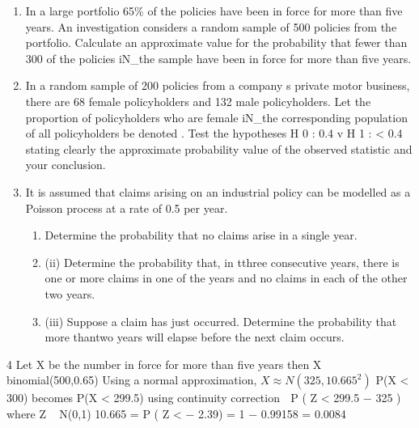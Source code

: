 \documentclass[a4paper,12pt]{article}
\begin{document}
\begin{enumerate}

\item In a large portfolio 65\% of the policies have been in force for more than five years.
An investigation considers a random sample of 500 policies from the portfolio.
Calculate an approximate value for the probability that fewer than 300 of the policies
iN_the sample have been in force for more than five years.


\item In a random sample of 200 policies from a company s private motor business, there
are 68 female policyholders and 132 male policyholders.
Let the proportion of policyholders who are female iN_the corresponding population of
all policyholders be denoted .
Test the hypotheses
H 0 :
0.4 v H 1 :
< 0.4
stating clearly the approximate probability value of the observed statistic and your conclusion.
%
\item It is assumed that claims arising on an industrial policy can be modelled as a Poisson process at a rate of 0.5 per year.

\begin{enumerate}[\item (i)] 
\item Determine the probability that no claims arise in a single year.
%
\item (ii) Determine the probability that, in tthree consecutive years, there is one or more claims in one of the years and no claims in each of the other two years.

\item (iii) Suppose a claim has just occurred. Determine the probability that more thantwo years will elapse before the next claim occurs.
\end{enumerate}
\end{enumerate}
\newpage

4
Let X be the number in force for more than five years
then X ~ binomial(500,0.65)
Using a normal approximation, $X ≈ N(325, 10.665^2 )$
P(X < 300) becomes P(X < 299.5) using continuity correction
 P ( Z <
299.5 − 325
) where Z ~ N(0,1)
10.665
= P ( Z < − 2.39) = 1 − 0.99158 = 0.0084
\end{document}
